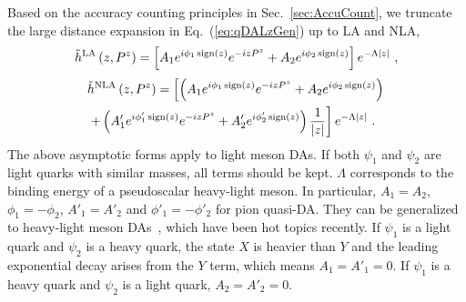 \documentclass[a4paper,11pt]{article}
\begin{document}
Based on the accuracy counting principles in Sec.~\ref{sec:AccuCount}, we truncate the large distance expansion in Eq.~(\ref{eq:qDALzGen}) up to LA and NLA,
\begin{align}
\tilde{h}^{\rm LA}\left(z,P^z\right) = 
\left[A_1 e^{i \phi_1 \, {\rm sign}(z)} e^{-i z P^z} + A_2 e^{i \phi_2 \, {\rm sign}(z)} \right]e^{-\Lambda |z|}  \ ,
\end{align}
\begin{align}
&\tilde{h}^{\rm NLA}\left(z,P^z\right) = 
\left[ \left(A_1 e^{i \phi_1 \, {\rm sign}(z)} e^{-i z P^z} + A_2 e^{i \phi_2 \, {\rm sign}(z)} \right) \right. \nonumber\\
&\left.+ \left(A'_1 e^{i \phi'_1 \, {\rm sign}(z)} e^{-i z P^z} + A'_2 e^{i \phi'_2 \, {\rm sign}(z)} \right) \frac{1}{|z|} \right] e^{-\Lambda |z|}  \ .
\end{align}
The above asymptotic forms apply to light meson DAs. If both $\psi_1$ and $\psi_2$ are light quarks with similar masses, all terms should be kept. $\Lambda$ corresponds to the binding energy of a pseudoscalar heavy-light meson. In particular, $A_1=A_2$, $\phi_1=-\phi_2$, $A'_1=A'_2$ and $\phi'_1=-\phi'_2$ for pion quasi-DA. They can be generalized to heavy-light meson DAs~\cite{Xu:2022guw,Hu:2023bba,LatticeParton:2024zko,Han:2024cht,Deng:2024dkd,Han:2024fkr,Guo:2025obm}, which have been hot topics recently. If $\psi_1$ is a light quark and $\psi_2$ is a heavy quark, the state $X$ is heavier than $Y$ and the leading exponential decay arises from the $Y$ term, which means $A_1 = A'_1 = 0$. If $\psi_1$ is a heavy quark and $\psi_2$ is a light quark, $A_2 = A'_2 = 0$. 
\end{document}
